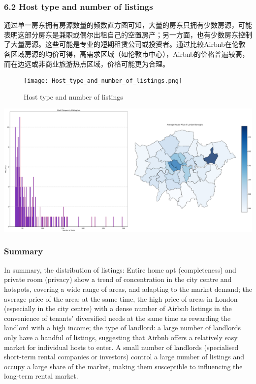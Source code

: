 \documentclass[
  letterpaper,
  DIV=11,
  numbers=noendperiod]{scrartcl}
\begin{document}
\hypertarget{host-type-and-number-of-listings}{%
\subsubsection{6.2 Host type and number of
listings}\label{host-type-and-number-of-listings}}

通过单一房东拥有房源数量的频数直方图可知，大量的房东只拥有少数房源，可能表明这部分房东是兼职或偶尔出租自己的空置房产；另一方面，也有少数房东控制了大量房源。这些可能是专业的短期租赁公司或投资者。通过比较Airbnb在伦敦各区域房源的均价可得，高需求区域（如伦敦市中心），Airbnb的价格普遍较高，而在边远或非商业旅游热点区域，价格可能更为合理。

\begin{figure}

{\centering \texttt{[image: Host\_type\_and\_number\_of\_listings.png]}

}

\caption{Host type and number of listings}

\end{figure}

\includegraphics{Template_files/figure-pdf/cell-7-output-1.pdf}

\hypertarget{summary}{%
\subsubsection{Summary}\label{summary}}

In summary, the distribution of listings: Entire home apt (completeness)
and private room (privacy) show a trend of concentration in the city
centre and hotspots, covering a wide range of areas, and adapting to the
market demand; the average price of the area: at the same time, the high
price of areas in London (especially in the city centre) with a dense
number of Airbnb listings in the convenience of tenants' diversified
needs at the same time as rewarding the landlord with a high income; the
type of landlord: a large number of landlords only have a handful of
listings, suggesting that Airbnb offers a relatively easy market for
individual hosts to enter. A small number of landlords (specialised
short-term rental companies or investors) control a large number of
listings and occupy a large share of the market, making them susceptible
to influencing the long-term rental market.
\end{document}
